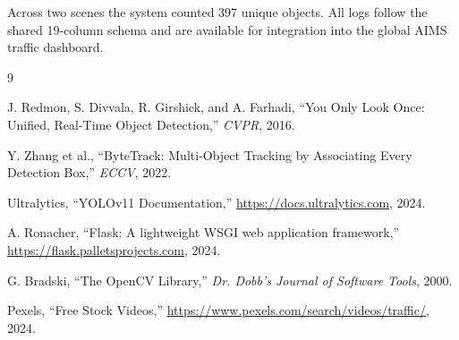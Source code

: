 \documentclass[12pt,a4paper,leqno]{report}
\begin{document}
Across two scenes the system counted 397 unique objects. All logs follow the shared 19-column schema and are available for integration into the global AIMS traffic dashboard.

\begin{thebibliography}{9}

J. Redmon, S. Divvala, R. Girshick, and A. Farhadi,
``You Only Look Once: Unified, Real-Time Object Detection,''
\textit{CVPR}, 2016.

Y. Zhang et al.,
``ByteTrack: Multi-Object Tracking by Associating Every Detection Box,''
\textit{ECCV}, 2022.

Ultralytics, ``YOLOv11 Documentation,''
\url{https://docs.ultralytics.com}, 2024.

A. Ronacher, ``Flask: A lightweight WSGI web application framework,''
\url{https://flask.palletsprojects.com}, 2024.

G. Bradski, ``The OpenCV Library,''
\textit{Dr. Dobb's Journal of Software Tools}, 2000.

Pexels, ``Free Stock Videos,''
\url{https://www.pexels.com/search/videos/traffic/}, 2024.

\end{thebibliography}
\end{document}

